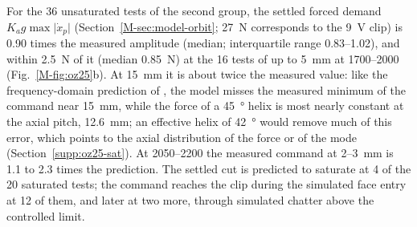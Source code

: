 For the 36 unsaturated tests of the second group, the settled forced demand $K_ag\max\lvert\dot x_p\rvert$ (Section~\ref{M-sec:model-orbit}; \SI{27}{\newton} corresponds to the \SI{9}{\volt} clip) is 0.90 times the measured amplitude (median; interquartile range 0.83--1.02), and within \SI{2.5}{\newton} of it (median \SI{0.85}{\newton}) at the 16 tests of up to \SI{5}{\milli\metre} at 1700--\SI{2000}{\rpm} (Fig.~\ref{M-fig:oz25}b). At \SI{15}{\milli\metre} it is about twice the measured value: like the frequency-domain prediction of \citet{ozsoy2025frequency}, the model misses the measured minimum of the command near \SI{15}{\milli\metre}, while the force of a \SI{45}{\degree} helix is most nearly constant at the axial pitch, \SI{12.6}{\milli\metre}; an effective helix of \SI{42}{\degree} would remove much of this error, which points to the axial distribution of the force or of the mode (Section~\ref{supp:oz25-sat}). At 2050--\SI{2200}{\rpm} the measured command at 2--\SI{3}{\milli\metre} is 1.1 to 2.3 times the prediction. The settled cut is predicted to saturate at 4 of the 20 saturated tests; the command reaches the clip during the simulated face entry at 12 of them, and later at two more, through simulated chatter above the controlled limit.

